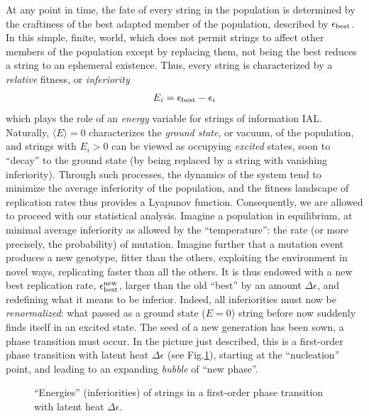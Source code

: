 \documentclass[letterpaper]{article}
\begin{document}
At any point in time, the fate of every string in the population is
determined by the craftiness of the best adapted member of the
population, described by $\epsilon_{\rm best}$. In this simple,
finite, world, which does not permit strings to affect other members
of the population except by replacing them, not being the best reduces
a string to an ephemeral existence. Thus, every string is
characterized by a {\em relative} fitness, or {\em inferiority}
\begin{eqnarray}
E_i=\epsilon_{\rm best}-\epsilon_i
\end{eqnarray}
which plays the role of an {\em energy} variable for strings of
information {IAL}. Naturally, $\langle E\rangle=0$ characterizes the
{\em ground state}, or vacuum, of the population, and strings with
$E_i>0$ can be viewed as occupying {\em excited} states, soon to
``decay'' to the ground state (by being replaced by a string with
vanishing inferiority). Through such processes, the dynamics of the
system tend to minimize the average inferiority of the population, and
the fitness landscape of replication rates thus provides a Lyapunov
function. Consequently, we are allowed to proceed with our statistical
analysis. Imagine a population in equilibrium, at minimal average
inferiority as allowed by the ``temperature'': the rate (or more
precisely, the probability) of mutation. Imagine further that a
mutation event produces a new genotype, fitter than the others,
exploiting the environment in novel ways, replicating faster than all
the others. It is thus endowed with a new best replication rate,
$\epsilon_{\rm best}^{\rm new}$, larger than the old ``best'' by an
amount $\Delta \epsilon$, and redefining what it means to be
inferior. Indeed, all inferiorities must now be {\em renormalized}:
what passed as a ground state ($E=0$) string before now suddenly finds
itself in an excited state. The seed of a new generation has been
sown, a phase transition must occur. In the picture just described,
this is a first-order phase transition with latent heat
$\Delta\epsilon$ (see Fig.\ref{fig1}), starting at the ``nucleation''
point, and leading to an expanding {\em bubble} of ``new phase''.


\begin{figure}[t]
\begin{center}
\caption{``Energies'' (inferiorities) of strings in a first-order
  phase transition with latent heat $\Delta\epsilon$.}
\label{fig1}
\end{center}
\end{figure}
\end{document}
